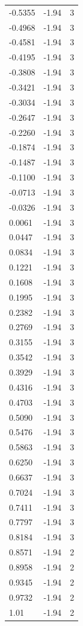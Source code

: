\begin{longtable}{lrr}
  -0.5355 & -1.94 & 3 \\
  -0.4968 & -1.94 & 3 \\
  -0.4581 & -1.94 & 3 \\
  -0.4195 & -1.94 & 3 \\
  -0.3808 & -1.94 & 3 \\
  -0.3421 & -1.94 & 3 \\
  -0.3034 & -1.94 & 3 \\
  -0.2647 & -1.94 & 3 \\
  -0.2260 & -1.94 & 3 \\
  -0.1874 & -1.94 & 3 \\
  -0.1487 & -1.94 & 3 \\
  -0.1100 & -1.94 & 3 \\
  -0.0713 & -1.94 & 3 \\
  -0.0326 & -1.94 & 3 \\
  0.0061 & -1.94 & 3 \\
  0.0447 & -1.94 & 3 \\
  0.0834 & -1.94 & 3 \\
  0.1221 & -1.94 & 3 \\
  0.1608 & -1.94 & 3 \\
  0.1995 & -1.94 & 3 \\
  0.2382 & -1.94 & 3 \\
  0.2769 & -1.94 & 3 \\
  0.3155 & -1.94 & 3 \\
  0.3542 & -1.94 & 3 \\
  0.3929 & -1.94 & 3 \\
  0.4316 & -1.94 & 3 \\
  0.4703 & -1.94 & 3 \\
  0.5090 & -1.94 & 3 \\
  0.5476 & -1.94 & 3 \\
  0.5863 & -1.94 & 3 \\
  0.6250 & -1.94 & 3 \\
  0.6637 & -1.94 & 3 \\
  0.7024 & -1.94 & 3 \\
  0.7411 & -1.94 & 3 \\
  0.7797 & -1.94 & 3 \\
  0.8184 & -1.94 & 3 \\
  0.8571 & -1.94 & 2 \\
  0.8958 & -1.94 & 2 \\
  0.9345 & -1.94 & 2 \\
  0.9732 & -1.94 & 2 \\
  1.01 & -1.94 & 2 \\

\end{longtable}
